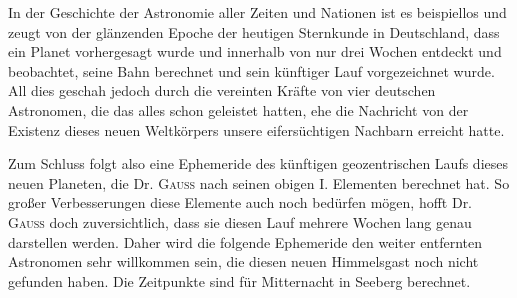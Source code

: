 In der Geschichte der Astronomie aller Zeiten und Nationen ist es beispiellos und zeugt von der glänzenden Epoche der heutigen Sternkunde in Deutschland, dass ein Planet vorhergesagt wurde und innerhalb von nur drei Wochen entdeckt und beobachtet, seine Bahn berechnet und sein künftiger Lauf vorgezeichnet wurde. All dies geschah jedoch durch die vereinten Kräfte von vier deutschen Astronomen, die das alles schon geleistet hatten, ehe die Nachricht von der Existenz dieses neuen Weltkörpers unsere eifersüchtigen Nachbarn erreicht hatte.

Zum Schluss folgt also eine Ephemeride des künftigen geozentrischen Laufs dieses neuen Planeten, die Dr. \textsc{Gauss} nach seinen obigen I. Elementen berechnet hat. So großer Verbesserungen diese Elemente auch noch bedürfen mögen, hofft Dr. \textsc{Gauss} doch zuversichtlich, dass sie diesen Lauf mehrere Wochen lang genau darstellen werden. Daher wird die folgende Ephemeride den weiter entfernten Astronomen sehr willkommen sein, die diesen neuen Himmelsgast noch nicht gefunden haben. Die Zeitpunkte sind für Mitternacht in Seeberg berechnet.

